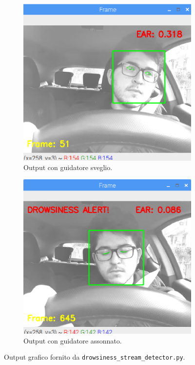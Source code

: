 \documentclass[12pt]{article}
\begin{document}
\begin{figure}
	\begin{subfigure}{.5\textwidth}
		\centering
		\includegraphics[width=.8\linewidth]{eps/gf_opened_eyes.eps}
		\caption{Output con guidatore sveglio.}
	\end{subfigure}
	\hspace{5mm}
	\begin{subfigure}{.5\textwidth}
		\centering
		\includegraphics[width=.8\linewidth]{eps/gf_closed_eyes.eps}
		\caption{Output con guidatore assonnato.}
	\end{subfigure}
	\caption{Output grafico fornito da \texttt{drowsiness\_stream\_detector.py}.}
	\label{fig:drowsiness_output}
\end{figure}
\end{document}
